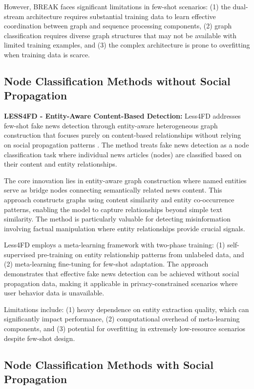 However, BREAK faces significant limitations in few-shot scenarios: (1) the dual-stream architecture requires substantial training data to learn effective coordination between graph and sequence processing components, (2) graph classification requires diverse graph structures that may not be available with limited training examples, and (3) the complex architecture is prone to overfitting when training data is scarce.

\subsection{Node Classification Methods without Social Propagation}

\textbf{LESS4FD - Entity-Aware Content-Based Detection:} Less4FD addresses few-shot fake news detection through entity-aware heterogeneous graph construction that focuses purely on content-based relationships without relying on social propagation patterns \cite{zhang2023less4fd}. The method treats fake news detection as a node classification task where individual news articles (nodes) are classified based on their content and entity relationships.

The core innovation lies in entity-aware graph construction where named entities serve as bridge nodes connecting semantically related news content. This approach constructs graphs using content similarity and entity co-occurrence patterns, enabling the model to capture relationships beyond simple text similarity. The method is particularly valuable for detecting misinformation involving factual manipulation where entity relationships provide crucial signals.

Less4FD employs a meta-learning framework with two-phase training: (1) self-supervised pre-training on entity relationship patterns from unlabeled data, and (2) meta-learning fine-tuning for few-shot adaptation. The approach demonstrates that effective fake news detection can be achieved without social propagation data, making it applicable in privacy-constrained scenarios where user behavior data is unavailable.

Limitations include: (1) heavy dependence on entity extraction quality, which can significantly impact performance, (2) computational overhead of meta-learning components, and (3) potential for overfitting in extremely low-resource scenarios despite few-shot design.

\subsection{Node Classification Methods with Social Propagation}

